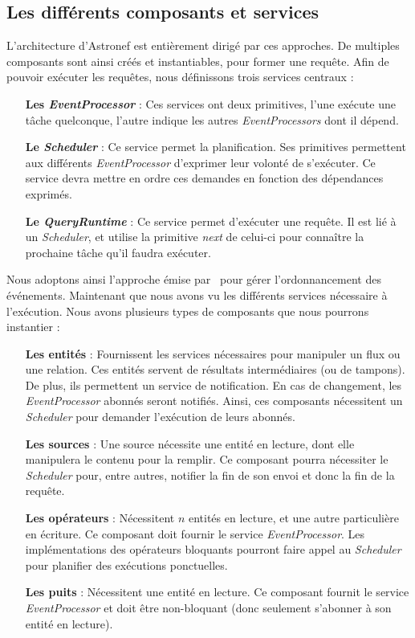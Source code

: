 \subsection{Les différents composants et services}
L'architecture d'Astronef est entièrement dirigé par ces approches. De multiples composants sont ainsi créés et instantiables, pour former une requête. Afin de pouvoir exécuter les requêtes, nous définissons trois services centraux :
\begin{itemize}
	\item[\textbf{Les \textit{EventProcessor}}] : Ces services ont deux primitives, l'une exécute une tâche quelconque, l'autre indique les autres \textit{EventProcessors} dont il dépend.
	\item[\textbf{Le \textit{Scheduler}}] : Ce service permet la planification. Ses primitives permettent aux différents \textit{EventProcessor} d'exprimer leur volonté de s'exécuter. Ce service devra mettre en ordre ces demandes en fonction des dépendances exprimés.
	\item[\textbf{Le \textit{QueryRuntime}}] : Ce service permet d'exécuter une requête. Il est lié à un \textit{Scheduler}, et utilise la primitive \textit{next} de celui-ci pour connaître la prochaine tâche qu'il faudra exécuter.
\end{itemize}

Nous adoptons ainsi l'approche émise par~\cite{Carney:scheduling} pour gérer l'ordonnancement des événements. Maintenant que nous avons vu les différents services nécessaire à l'exécution. Nous avons plusieurs types de composants que nous pourrons instantier :
\begin{itemize}
	\item[\textbf{Les entités}] : Fournissent les services nécessaires pour manipuler un flux ou une relation. Ces entités servent de résultats intermédiaires (ou de tampons). De plus, ils permettent un service de notification. En cas de changement, les \textit{EventProcessor} abonnés seront notifiés. Ainsi, ces composants nécessitent un \textit{Scheduler} pour demander l'exécution de leurs abonnés.
	\item[\textbf{Les sources}] : Une source nécessite une entité en lecture, dont elle manipulera le contenu pour la remplir. Ce composant pourra nécessiter le \textit{Scheduler} pour, entre autres, notifier la fin de son envoi et donc la fin de la requête.
	\item[\textbf{Les opérateurs}] : Nécessitent $n$ entités en lecture, et une autre particulière en écriture. Ce composant doit fournir le service \textit{EventProcessor}. Les implémentations des opérateurs bloquants pourront faire appel au \textit{Scheduler} pour planifier des exécutions ponctuelles.
	\item[\textbf{Les puits}] : Nécessitent une entité en lecture. Ce composant fournit le service \textit{EventProcessor} et doit être non-bloquant (donc seulement s'abonner à son entité en lecture).
\end{itemize}

